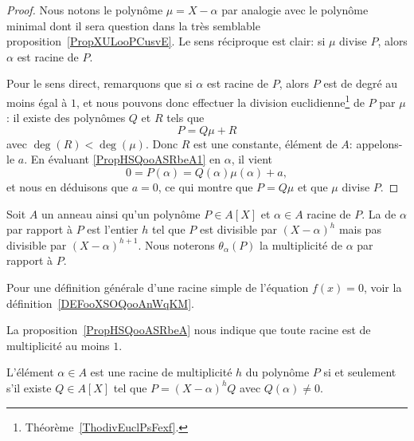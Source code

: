\begin{proof}
  Nous notons le polynôme \( \mu=X-\alpha\) par analogie avec le polynôme minimal dont il sera question dans la très semblable proposition~\ref{PropXULooPCusvE}. Le sens réciproque est clair: si $\mu$ divise $P$, alors $\alpha$ est racine de $P$.

  Pour le sens direct, remarquons que si $\alpha$ est racine de $P$, alors $P$ est de degré au moins égal à \( 1\), et nous pouvons donc effectuer la division euclidienne\footnote{Théorème~\ref{ThodivEuclPsFexf}.} de \( P\) par \( \mu\) : il existe des polynômes \( Q\) et \( R\) tels que
    \begin{equation} \label{PropHSQooASRbeA1}
        P=Q\mu+R
    \end{equation}
    avec \( \deg(R)<\deg(\mu)\). Donc \( R\) est une constante,
    élément de $A$: appelons-le $a$. En évaluant
    \eqref{PropHSQooASRbeA1} en \( \alpha\), il vient
    \begin{equation}
        0 = P(\alpha)=Q(\alpha)\mu(\alpha)+a,
    \end{equation}
    et nous en déduisons que \( a=0\), ce qui montre que \( P=Q\mu\) et que \( \mu\) divise \( P\).
\end{proof}

\begin{definition}
  Soit \( A\) un anneau ainsi qu'un polynôme \( P\in A[X]\) et \( \alpha\in A\) racine de $P$. La  de \( \alpha\) par rapport à \( P\) est l'entier \( h\) tel que \( P\) est divisible par \( (X-\alpha)^h\) mais pas divisible par \( (X-\alpha)^{h+1}\).  Nous noterons \( \theta_{\alpha}(P)\) la multiplicité de \( \alpha\) par rapport à \( P\).
\end{definition}

Pour une définition générale d'une racine simple de l'équation \( f(x)=0\), voir la définition~\ref{DEFooXSOQooAnWqKM}.

La proposition~\ref{PropHSQooASRbeA} nous indique que toute racine est de multiplicité au moins \( 1\).

\begin{proposition} \label{PropahQQpA}
  L'élément \( \alpha\in A\) est une racine de multiplicité \( h\) du
  polynôme \( P\) si et seulement s'il existe \( Q\in A[X]\) tel que
  \( P=(X-\alpha)^hQ\) avec \( Q(\alpha)\neq 0\).
\end{proposition}

